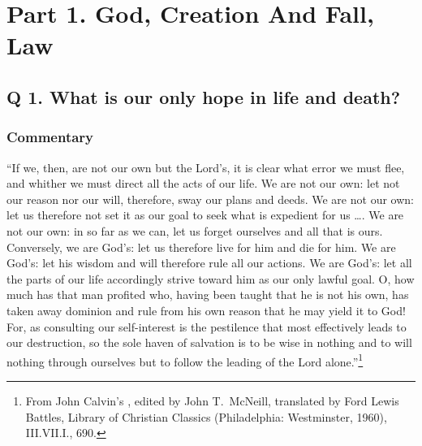 

\section{Part 1. God, Creation And Fall, Law}

\subsection{Q  1. What is our only hope in life and death?}


\subsubsection{Commentary}

\label{q1comment}``If we, then, are not our own but the Lord's, it is clear what error we must flee, and whither we must direct all the acts of our life. We are not our own: let not our reason nor our will, therefore, sway our plans and deeds. We are not our own: let us therefore not set it as our goal to seek what is expedient for us  \dots{}. We are not our own: in so far as we can, let us forget ourselves and all that is ours. Conversely, we are God's: let us therefore live for him and die for him. We are God's: let his wisdom and will therefore rule all our actions. We are God's: let all the parts of our life accordingly strive toward him as our only lawful goal. O, how much has that man profited who, having been taught that he is not his own, has taken away dominion and rule from his own reason that he may yield it to God! For, as consulting our self-interest is the pestilence that most effectively leads to our destruction, so the sole haven of salvation is to be wise in nothing and to will nothing through ourselves but to follow the leading of the Lord alone.''\footnote{From John Calvin's , edited by John T.\ McNeill, translated by Ford Lewis Battles, Library of Christian Classics (Philadelphia: Westminster, 1960), III.VII.I., 690.}


